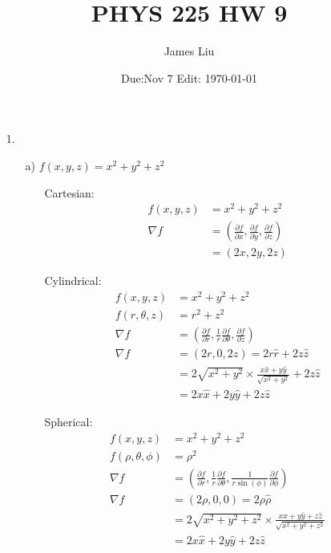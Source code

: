 \documentclass{article}
\date{Due:Nov 7 Edit: \today}
\title{PHYS 225 HW 9}
\author{James Liu}
\begin{document}
\maketitle
\begin{itemize}
    \item [1.]
    \begin{itemize}
        \item [a)] \(f(x,y,z)=x^2+y^2+z^2\)
        \begin{itemize}
            \item [Cartesian:] 
            \begin{align*}
                f(x,y,z)&=x^2+y^2+z^2\\
                \nabla f&=\left(\frac{\partial f}{\partial x},\frac{\partial f}{\partial y},\frac{\partial f}{\partial z}\right)\\
                &=\left(2x,2y,2z\right)
            \end{align*}
            \item [Cylindrical:]
            \begin{align*}
                f(x,y,z)&=x^2+y^2+z^2\\
                f(r,\theta,z)&=r^2+z^2\\
                \nabla f &=\left(\frac{\partial f}{\partial r},\frac{1}{r}\frac{\partial f}{\partial \theta},\frac{\partial f}{\partial z}\right)\\
                \nabla f &=\left(2r,0,2z\right) = 2r\hat{r}+2z\hat{z}\\
                &=2 \sqrt{x^2+y^2} \times \frac{x\hat{x}+y\hat{y}}{\sqrt{x^2+y^2}}+2z\hat z\\
                &=2x\hat x+2y\hat y+2z\hat z
            \end{align*}
            \item [Spherical:]
            \begin{align*}
                f(x,y,z)&=x^2+y^2+z^2\\
                f(\rho,\theta,\phi)&=\rho^2\\
                \nabla f &=\left(\frac{\partial f}{\partial r},\frac{1}{r}\frac{\partial f}{\partial \theta},\frac{1}{r\sin(\phi)}\frac{\partial f}{\partial \phi}\right)\\
                \nabla f&=\left(2\rho,0,0\right) = 2\rho \hat \rho\\
                &=2\sqrt{x^2+y^2+z^2}\times \frac{x\hat{x}+y\hat{y}+z\hat z}{\sqrt{x^2+y^2+z^2}}\\
                &=2x\hat x+2y\hat y+2z\hat z
            \end{align*}






\end{itemize}
\end{itemize}
\end{itemize}
\end{document}
